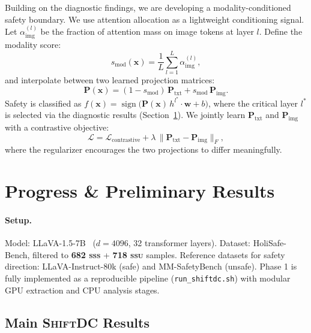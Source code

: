 \documentclass{article}
\newcommand{\ShiftDC}{\textsc{ShiftDC}}
\begin{document}
Building on the diagnostic findings, we are developing a modality-conditioned safety
boundary.
We use attention allocation as a lightweight conditioning signal.
Let $\alpha_\text{img}^{(l)}$ be the fraction of attention mass on image tokens at layer $l$.
Define the modality score:
\begin{equation}
  s_\text{mod}(\mathbf{x}) = \frac{1}{L}\sum_{l=1}^{L}\alpha_\text{img}^{(l)},
\end{equation}
and interpolate between two learned projection matrices:
\begin{equation}
  \mathbf{P}(\mathbf{x}) =
    (1-s_\text{mod})\,\mathbf{P}_\text{txt} + s_\text{mod}\,\mathbf{P}_\text{img}.
\end{equation}
Safety is classified as
$f(\mathbf{x}) = \operatorname{sign}\!\bigl(\mathbf{P}(\mathbf{x})\,h^{l^*}\cdot\mathbf{w}+b\bigr)$,
where the critical layer $l^*$ is selected via the diagnostic results (Section~\ref{sec:results}).
We jointly learn $\mathbf{P}_\text{txt}$ and $\mathbf{P}_\text{img}$ with a contrastive
objective:
\begin{equation}
  \mathcal{L} = \mathcal{L}_\text{contrastive}
              + \lambda\,\|\mathbf{P}_\text{txt} - \mathbf{P}_\text{img}\|_F,
\end{equation}
where the regularizer encourages the two projections to differ meaningfully.

\section{Progress \& Preliminary Results}
\label{sec:results}

\paragraph{Setup.}
Model: LLaVA-1.5-7B~\cite{liu2024llava15} ($d = 4096$, 32 transformer layers).
Dataset: HoliSafe-Bench, filtered to \textbf{682 \textsc{sss}} + \textbf{718 \textsc{ssu}}
samples.
Reference datasets for safety direction: LLaVA-Instruct-80k (safe) and MM-SafetyBench
(unsafe).
Phase 1 is fully implemented as a reproducible pipeline (\texttt{run\_shiftdc.sh})
with modular GPU extraction and CPU analysis stages.

\subsection{Main \ShiftDC{} Results}
\end{document}

